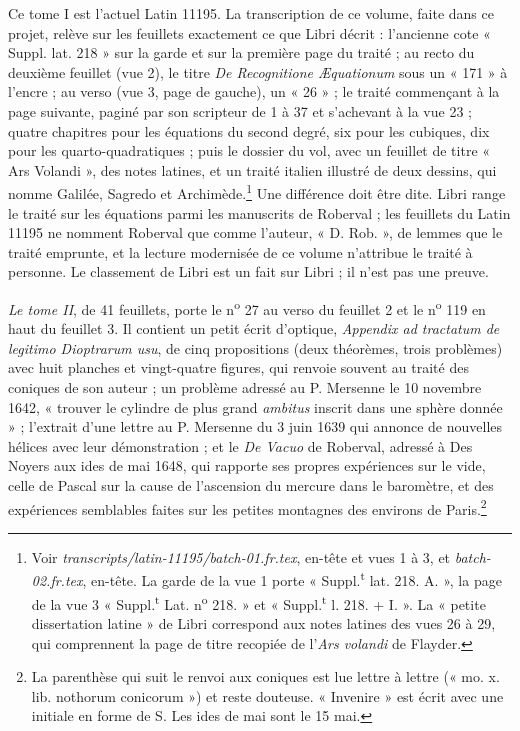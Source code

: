 \documentclass[11pt,a4paper]{article}
\begin{document}
Ce tome I est l'actuel Latin 11195. La transcription de ce volume, faite dans
ce projet, relève sur les feuillets exactement ce que Libri décrit : l'ancienne
cote « Suppl. lat. 218 » sur la garde et sur la première page du traité ; au
recto du deuxième feuillet (vue 2), le titre \emph{De Recognitione Æquationum}
sous un « 171 » à l'encre ; au verso (vue 3, page de gauche), un « 26 » ; le
traité commençant à la page suivante, paginé par son scripteur de 1 à 37 et
s'achevant à la vue 23 ; quatre chapitres pour les équations du second degré,
six pour les cubiques, dix pour les quarto-quadratiques ; puis le dossier du
vol, avec un feuillet de titre « Ars Volandi », des notes latines, et un traité
italien illustré de deux dessins, qui nomme Galilée, Sagredo et
Archimède.\footnote{Voir \emph{transcripts/latin-11195/batch-01.fr.tex}, en-tête
et vues 1 à 3, et \emph{batch-02.fr.tex}, en-tête. La garde de la vue 1 porte
« Suppl.\textsuperscript{t} lat. 218. A. », la page de la vue 3
« Suppl.\textsuperscript{t} Lat. n\textsuperscript{o} 218. » et
« Suppl.\textsuperscript{t} l. 218. + I. ». La « petite dissertation latine » de Libri correspond aux notes latines des vues 26 à 29, qui
comprennent la page de titre recopiée de l'\emph{Ars volandi} de Flayder.}
Une différence doit être dite. Libri range le traité sur les équations parmi
les manuscrits de Roberval ; les feuillets du Latin 11195 ne nomment Roberval
que comme l'auteur, « D. Rob. », de lemmes que le traité emprunte, et la
lecture modernisée de ce volume n'attribue le traité à personne. Le classement
de Libri est un fait sur Libri ; il n'est pas une preuve.

\emph{Le tome II}, de 41 feuillets, porte le n\textsuperscript{o} 27 au verso
du feuillet 2 et le n\textsuperscript{o} 119 en haut du feuillet 3. Il
contient un petit écrit d'optique, \emph{Appendix ad tractatum de legitimo
Dioptrarum usu}, de cinq propositions (deux théorèmes, trois problèmes) avec
huit planches et vingt-quatre figures, qui renvoie souvent au traité des
coniques de son auteur ; un problème adressé au P. Mersenne le 10 novembre
1642, « trouver le cylindre de plus grand \emph{ambitus} inscrit dans une
sphère donnée » ; l'extrait d'une lettre au P. Mersenne du 3 juin 1639 qui
annonce de nouvelles hélices avec leur démonstration ; et le \emph{De Vacuo}
de Roberval, adressé à Des Noyers aux ides de mai 1648, qui rapporte ses
propres expériences sur le vide, celle de Pascal sur la cause de l'ascension
du mercure dans le baromètre, et des expériences semblables faites sur les
petites montagnes des environs de Paris.\footnote{La parenthèse qui suit le
renvoi aux coniques est lue lettre à lettre (« mo. x. lib. nothorum
conicorum ») et reste douteuse. « Invenire » est écrit avec une initiale en
forme de S. Les ides de mai sont le 15 mai.}
\end{document}
